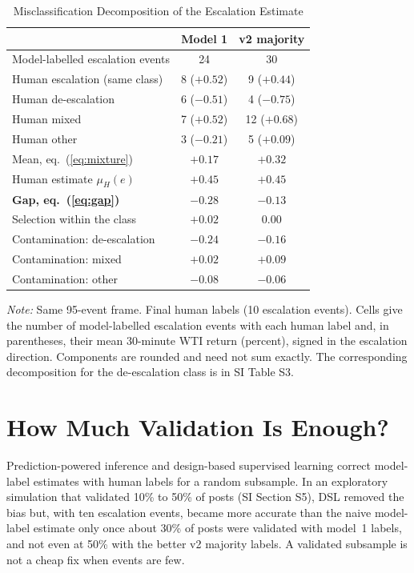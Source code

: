 \documentclass[12pt]{article}
\begin{document}
\begin{table}[t]
\centering
\small
\caption{Misclassification Decomposition of the Escalation Estimate}
\label{tab:decomp}
\begin{tabular}{lcc}
\toprule
 & Model 1 & v2 majority \\
\midrule
Model-labelled escalation events & 24 & 30 \\
\quad Human escalation (same class) & 8 ($+0.52$) & 9 ($+0.44$) \\
\quad Human de-escalation & 6 ($-0.51$) & 4 ($-0.75$) \\
\quad Human mixed & 7 ($+0.52$) & 12 ($+0.68$) \\
\quad Human other & 3 ($-0.21$) & 5 ($+0.09$) \\
\midrule
Mean, eq.~(\ref{eq:mixture}) & $+0.17$ & $+0.32$ \\
Human estimate $\mu_H(e)$ & $+0.45$ & $+0.45$ \\
\textbf{Gap, eq.~(\ref{eq:gap})} & $\mathbf{-0.28}$ & $\mathbf{-0.13}$ \\
\quad Selection within the class & $+0.02$ & $0.00$ \\
\quad Contamination: de-escalation & $-0.24$ & $-0.16$ \\
\quad Contamination: mixed & $+0.02$ & $+0.09$ \\
\quad Contamination: other & $-0.08$ & $-0.06$ \\
\bottomrule
\end{tabular}

\vspace{0.5em}
\begin{minipage}{0.85\textwidth}
\footnotesize\textit{Note:} Same 95-event frame. Final human labels (10 escalation events). Cells give the number of model-labelled escalation events with each human label and, in parentheses, their mean 30-minute WTI return (percent), signed in the escalation direction. Components are rounded and need not sum exactly. The corresponding decomposition for the de-escalation class is in SI Table S3.
\end{minipage}
\end{table}

\section{How Much Validation Is Enough?}

Prediction-powered inference \citep{angelopoulos2023} and design-based supervised learning \citep[DSL;][]{egami2023} correct model-label estimates with human labels for a random subsample. In an exploratory simulation that validated 10\% to 50\% of posts (SI Section S5), DSL removed the bias but, with ten escalation events, became more accurate than the naive model-label estimate only once about 30\% of posts were validated with model~1 labels, and not even at 50\% with the better v2 majority labels. A validated subsample is not a cheap fix when events are few.
\end{document}
